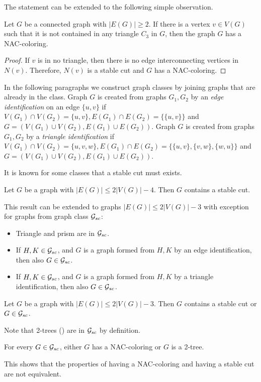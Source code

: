 The statement can be extended to the following simple observation.
%
\begin{corollary}
	Let \( G \) be a connected graph with \( |E(G)| \ge 2 \).
	If there is a vertex \( v \in V(G) \) such that it is
	not contained in any triangle \( C_3 \) in \( G \),
	then the graph \( G \) has a NAC-coloring.
\end{corollary}
%
\begin{proof}
	If \( v \) is in no triangle, then there is no edge interconnecting
	vertices in \( N(v) \). Therefore, \( N(v) \) is a stable cut and \( G \)
	has a NAC-coloring.
\end{proof}

In the following paragraphs we construct graph classes by joining graphs
that are already in the class.
Graph \( G \) is created from graphs \( G_1, G_2 \) by an \emph{edge identification}
on an edge \( \{u, v\} \)
if \( V(G_1) \cap V(G_2) = \{u, v\}, E(G_1) \cap E(G_2) = \{\{u, v\}\} \)
and \( G = (V(G_1) \cup V(G_2), E(G_1) \cup E(G_2)) \).
Graph \( G \) is created from graphs \( G_1, G_2 \) by a \emph{triangle identification}
if \( V(G_1) \cap V(G_2) = \{u, v, w\}, E(G_1) \cap E(G_2) = \{\{u, v\}, \{v, w\}, \{w, u\}\} \)
and \( G = (V(G_1) \cup V(G_2), E(G_1) \cup E(G_2)) \).

It is known for some classes that a stable cut must exists.
%
\begin{theorem}
	Let \( G \) be a graph with \( |E(G)| \le 2|V(G)|-4 \).
	Then \( G \) contains a stable cut.
\end{theorem}
%
This result can be extended to graphs \( |E(G)| \le 2|V(G)|-3 \) with exception
for graphs from graph class \( \mathcal{G}_{sc} \):
%
\begin{itemize}
	\item Triangle and prism are in \( \mathcal{G}_{sc} \).
	\item If \( H, K \in \mathcal{G}_{sc} \), and \( G \) is a graph
	      formed from \( H, K \) by an edge identification,
	      then also \( G \in \mathcal{G}_{sc} \).
	\item If \( H, K \in \mathcal{G}_{sc} \), and \( G \) is a graph
	      formed from \( H, K \) by a triangle identification,
	      then also \( G \in \mathcal{G}_{sc} \).
\end{itemize}
%
%
\begin{theorem}
	Let \( G \) be a graph with \( |E(G)| \le 2|V(G)|-3 \). Then \( G \) contains
	a stable cut or \( G \in \mathcal{G}_{sc} \).
\end{theorem}
%
Note that 2-trees ()
are in \( \mathcal{G}_{sc} \) by definition.
%
\begin{lemma}
	For every \( G \in \mathcal{G}_{sc} \), either \( G \) has a NAC-coloring
	or \( G \) is a 2-tree.
\end{lemma}
%
This shows that the properties of having a NAC-coloring and having a stable cut
are not equivalent.

